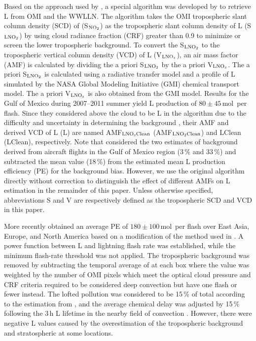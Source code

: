 \documentclass[amt]{copernicus}
\begin{document}
Based on the approach used by \citet{Bucsela.2010}, a special algorithm was developed by \citet{Pickering.2016} to retrieve L from OMI and the WWLLN.
The algorithm takes the OMI tropospheric slant column density (SCD) of  (S$_\chem{NO_2}$) as the tropospheric slant column density of L (S$_\chem{LNO_2}$) by using cloud radiance fraction (CRF) greater than 0.9 to minimize or screen the lower tropospheric background.
To convert the S$_\chem{LNO_2}$ to the tropospheric vertical column density (VCD) of L (V$_\chem{LNO_\mathit{x}}$), an air mass factor (AMF) is calculated by dividing the a priori S$_\chem{LNO_2}$ by the a priori V$_\chem{LNO_\mathit{x}}$.
The a priori S$_\chem{LNO_2}$ is calculated using a radiative transfer model and a profile of L simulated by the NASA Global Modeling Initiative (GMI) chemical transport model.
The a priori V$_\chem{LNO_\mathit{x}}$ is also obtained from the GMI model.
Results for the Gulf of Mexico during 2007--2011 summer yield L production of $80\pm 45$\,mol\, per flash.
Since they considered  above the cloud to be L in the algorithm due to the difficulty and uncertainty in determining the background , their AMF and derived VCD of L (L) are named AMF$_{\chem{LNO_\mathit{x}}\mathrm{Clean}}$ (AMF$_{\chem{LNO_2}\mathrm{Clean}}$) and LClean (LClean), respectively.
Note that \citet{Pickering.2016} considered the two estimates of background derived from aircraft flights in the Gulf of Mexico region (3\,{\%} and 33\,{\%}) and subtracted the mean value (18\,{\%}) from the estimated mean L production efficiency (PE) for the background bias.
However, we use the original algorithm directly without correction to distinguish the effect of different AMFs on L estimation in the remainder of this paper.
Unless otherwise specified, abbreviations S and V are respectively defined as the tropospheric SCD and VCD in this paper.

More recently \citet{Bucsela.2019} obtained an average PE of $180\pm 100$\,mol\, per flash over East Asia, Europe, and North America based on a modification of the method used in \citet{Pickering.2016}.
A power function between L and lightning flash rate was established, while the minimum flash-rate threshold was not applied.
The tropospheric  background was removed by subtracting the temporal average of  at each box where the value was weighted by the number of OMI pixels which meet the optical cloud pressure and CRF criteria required to be considered deep convection but have one flash or fewer instead.
The lofted pollution was considered to be 15\,{\%} of total  according to the estimation from \citet{DeCaria.2000,DeCaria.2005}, and the average chemical delay was adjusted by 15\,{\%} following the 3\,h L lifetime in the nearby field of convection \citep{Nault.2017}.
However, there were negative L values caused by the overestimation of the tropospheric background and stratospheric  at some locations.
\end{document}
